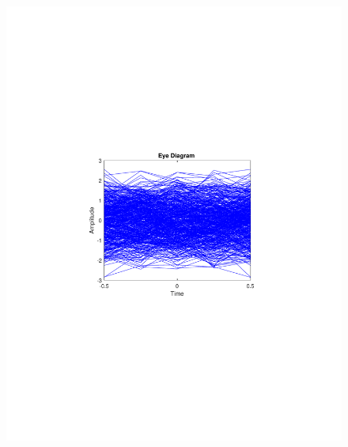 \begin{refsection}
\begin{figure}[H]
\begin{minipage}{0.30\textwidth}
		\includegraphics[clip, trim=4cm 8cm 4cm 8cm, width=1\textwidth]{./sdf/m_qam_system/figures/expResults/intradyne/1_eye_16GBdInSig13dB_AfFec.pdf}
		\label{fig:16GBdSpecAftFec}
	\end{minipage}
	\begin{minipage}{0.30\textwidth}
		\centering

\end{minipage}
\end{figure}
\end{refsection}
